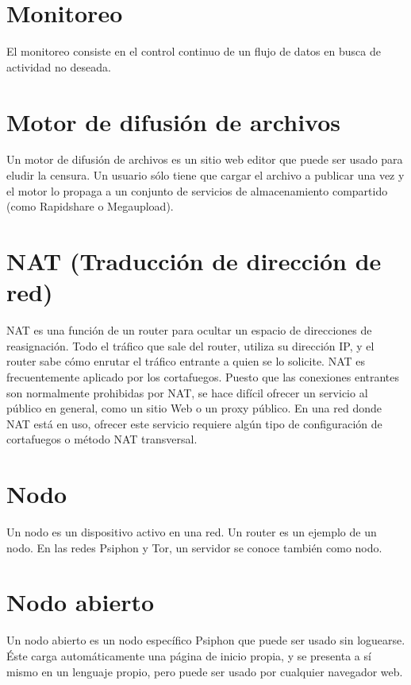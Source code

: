 \documentclass[10pt,a5paper,twoside,,]{book}
\begin{document}
\section{Monitoreo}\label{monitoreo}

El monitoreo consiste en el control continuo de un flujo de datos en
busca de actividad no deseada.

\section{Motor de difusión de
archivos}\label{motor-de-difusiuxf3n-de-archivos}

Un motor de difusión de archivos es un sitio web editor que puede ser
usado para eludir la censura. Un usuario sólo tiene que cargar el
archivo a publicar una vez y el motor lo propaga a un conjunto de
servicios de almacenamiento compartido (como Rapidshare o Megaupload).

\section{NAT (Traducción de dirección de
red)}\label{nat-traducciuxf3n-de-direcciuxf3n-de-red}

NAT es una función de un router para ocultar un espacio de direcciones
de reasignación. Todo el tráfico que sale del router, utiliza su
dirección IP, y el router sabe cómo enrutar el tráfico entrante a quien
se lo solicite. NAT es frecuentemente aplicado por los cortafuegos.
Puesto que las conexiones entrantes son normalmente prohibidas por NAT,
se hace difícil ofrecer un servicio al público en general, como un sitio
Web o un proxy público. En una red donde NAT está en uso, ofrecer este
servicio requiere algún tipo de configuración de cortafuegos o método
NAT transversal.

\section{Nodo}\label{nodo}

Un nodo es un dispositivo activo en una red. Un router es un ejemplo de
un nodo. En las redes Psiphon y Tor, un servidor se conoce también como
nodo.

\section{Nodo abierto}\label{nodo-abierto}

Un nodo abierto es un nodo específico Psiphon que puede ser usado sin
loguearse. Éste carga automáticamente una página de inicio propia, y se
presenta a sí mismo en un lenguaje propio, pero puede ser usado por
cualquier navegador web.
\end{document}
